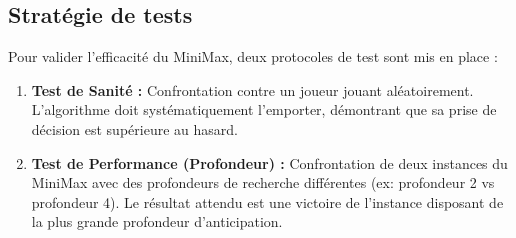 \documentclass[a4paper]{article}
\begin{document}
\subsection{Stratégie de tests}
Pour valider l'efficacité du MiniMax, deux protocoles de test sont mis en place :
\begin{enumerate}
    \item \textbf{Test de Sanité :} Confrontation contre un joueur jouant aléatoirement. L'algorithme doit systématiquement l'emporter, démontrant que sa prise de décision est supérieure au hasard.
    \item \textbf{Test de Performance (Profondeur) :} Confrontation de deux instances du MiniMax avec des profondeurs de recherche différentes (ex: profondeur 2 vs profondeur 4). Le résultat attendu est une victoire de l'instance disposant de la plus grande profondeur d'anticipation.
\end{enumerate}


\nocite{*}



\appendix
\end{document}
